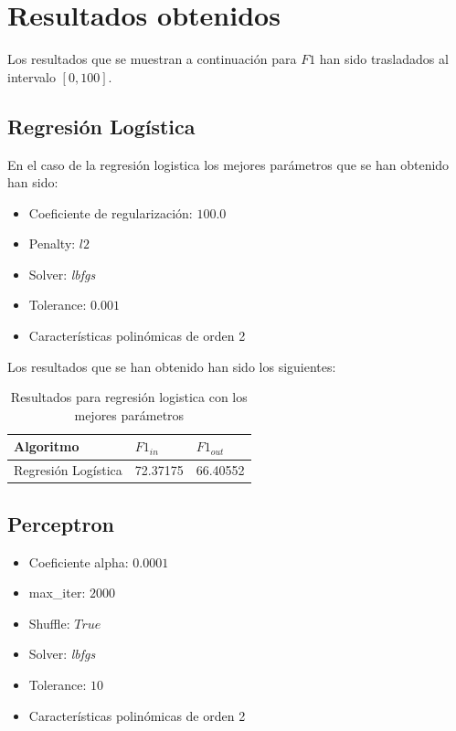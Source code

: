 \documentclass[11pt]{article}
\begin{document}
\section{Resultados obtenidos}

Los resultados que se muestran a continuación para $F1$ han sido trasladados al
intervalo $[0,100]$.

\subsection{Regresión Logística}

En el caso de la regresión logistica los mejores parámetros que se han obtenido 
han sido:

\begin{itemize}
    \item Coeficiente de regularización: $100.0$
    \item Penalty: $l2$
    \item Solver: \textit{lbfgs}
    \item Tolerance: $0.001$
    \item Características polinómicas de orden 2
\end{itemize}

Los resultados que se han obtenido han sido los siguientes:

\begin{table}[h!]
\centering
\begin{tabular}{|l|l|l|}
\hline
Algoritmo    & $F1_{in}$  & $F1_{out}$ \\ \hline
 Regresión Logística   & 72.37175  & 66.40552 \\ \hline
\end{tabular}
\caption{Resultados para regresión logistica con los mejores parámetros}
\end{table}

\subsection{Perceptron}

\begin{itemize}
    \item Coeficiente alpha: $0.0001$
    \item max\_iter: $2000$
    \item Shuffle: $True$
    \item Solver: \textit{lbfgs}
    \item Tolerance: $10$
    \item Características polinómicas de orden 2
\end{itemize}
\end{document}
